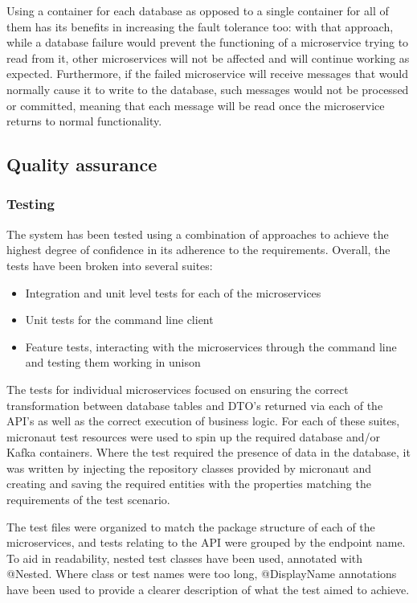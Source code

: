\documentclass[parskip=full]{article}
\begin{document}
Using a container for each database as opposed to a single container for all of them has its benefits in increasing the fault tolerance too: with that approach, while a database failure would prevent the functioning of a microservice trying to read from it, other microservices will not be affected and will continue working as expected.
Furthermore, if the failed microservice will receive messages that would normally cause it to write to the database, such messages would not be processed or committed, meaning that each message will be read once the microservice returns to normal functionality.

    \pagebreak
    \subsection{Quality assurance}
    \subsubsection{Testing}
    The system has been tested using a combination of approaches to achieve the highest degree of confidence in its adherence to the requirements.
    Overall, the tests have been broken into several suites:
    \begin{itemize}
        \item Integration and unit level tests for each of the microservices
        \item Unit tests for the command line client
        \item Feature tests, interacting with the microservices through the command line and testing them working in unison
    \end{itemize}
The tests for individual microservices focused on ensuring the correct transformation between database tables and DTO's returned via each of the API's as well as the correct execution of business logic.
For each of these suites, micronaut test resources were used to spin up the required database and/or Kafka containers.
Where the test required the presence of data in the database, it  was written by injecting the repository classes provided by micronaut and creating and saving the required entities with the properties matching the requirements of the test scenario.

The test files were organized to match the package structure of each of the microservices, and tests relating to the API were grouped by the endpoint name.
To aid in readability, nested test classes have been used, annotated with @Nested.
Where class or test names were too long, @DisplayName annotations have been used to provide a clearer description of what the test aimed to achieve.
\end{document}
